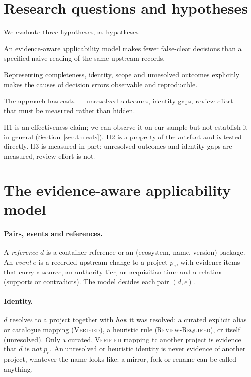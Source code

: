 \documentclass[11pt]{article}
\begin{document}
\section{Research questions and hypotheses}

We evaluate three hypotheses, as hypotheses.
\begin{description}[nosep,leftmargin=1.2em]
  \item[H1] An evidence-aware applicability model makes fewer false-clear
  decisions than a specified naive reading of the same upstream records.
  \item[H2] Representing completeness, identity, scope and unresolved outcomes
  explicitly makes the causes of decision errors observable and reproducible.
  \item[H3] The approach has costs --- unresolved outcomes, identity gaps,
  review effort --- that must be measured rather than hidden.
\end{description}
H1 is an effectiveness claim; we can observe it on our sample but not
establish it in general (Section~\ref{sec:threats}). H2 is a property of the
artefact and is tested directly. H3 is measured in part: unresolved outcomes
and identity gaps are measured, review effort is not.

\section{The evidence-aware applicability model}
\label{sec:model}

\paragraph{Pairs, events and references.} A \emph{reference} $d$ is a
container reference or an (ecosystem, name, version) package. An
\emph{event} $e$ is a recorded upstream change to a project $p_e$, with
evidence items that carry a source, an authority tier, an acquisition time and
a relation (supports or contradicts). The model decides each pair $(d,e)$.

\paragraph{Identity.} $d$ resolves to a project together with \emph{how} it was
resolved: a curated explicit alias or catalogue mapping (\textsc{Verified}), a
heuristic rule (\textsc{Review-Required}), or itself (unresolved). Only a
curated, \textsc{Verified} mapping to another project is evidence that $d$ is
\emph{not} $p_e$. An unresolved or heuristic identity is never evidence of
another project, whatever the name looks like: a mirror, fork or rename can be
called anything.
\end{document}
